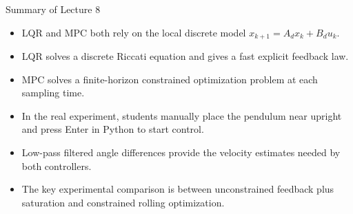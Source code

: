\documentclass[aspectratio=169]{beamer}
\begin{document}
\begin{frame}{Summary of Lecture 8}
\begin{itemize}
    \item LQR and MPC both rely on the local discrete model $x_{k+1}=A_dx_k+B_du_k$.

    \item LQR solves a discrete Riccati equation and gives a fast explicit feedback law.

    \item MPC solves a finite-horizon constrained optimization problem at each sampling time.

    \item In the real experiment, students manually place the pendulum near upright and press Enter in Python to start control.

    \item Low-pass filtered angle differences provide the velocity estimates needed by both controllers.

    \item The key experimental comparison is between unconstrained feedback plus saturation and constrained rolling optimization.
\end{itemize}
\end{frame}
\end{document}
